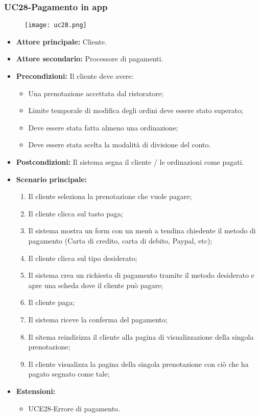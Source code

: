 \subsubsection{UC28-Pagamento in app}
\begin{figure}[h] \texttt{[image: uc28.png]} \end{figure}
\begin{itemize}
\item \textbf{Attore principale:} Cliente.
\item \textbf{Attore secondario:} Processore di pagamenti.
\item \textbf{Precondizioni:} Il cliente deve avere:
  \begin{itemize}
    \item Una prenotazione accettata dal ristoratore;
    \item Limite temporale di modifica degli ordini deve essere stato superato;
    \item Deve essere stata fatta almeno una ordinazione;
    \item Deve essere stata scelta la modalità di divisione del conto.
  \end{itemize}
\item \textbf{Postcondizioni:} Il sistema segna il cliente / le ordinazioni come pagati.
\item \textbf{Scenario principale:}
\begin{enumerate}
    \item Il cliente seleziona la prenotazione che vuole pagare;
    \item Il cliente clicca sul tasto paga;
    \item Il sistema mostra un form con un menù a tendina chiedente il metodo di pagamento
      (Carta di credito, carta di debito, Paypal, etc);
    \item Il cliente clicca sul tipo desiderato;
    \item Il sistema crea un richiesta di pagamento tramite il metodo desiderato e
      apre una scheda dove il cliente può pagare;
    \item Il cliente paga;
    \item Il sistema riceve la conferma del pagamento;
    \item Il sitema reindirizza il cliente alla pagina di visualizzazione della singola prenotazione;
    \item Il cliente visualizza la pagina della singola prenotazione con ciò che ha pagato segnato come tale;
\end{enumerate}
    \item \textbf{Estensioni:}
        \begin{itemize}
                \item UCE28-Errore di pagamento.
        \end{itemize}
\end{itemize}

